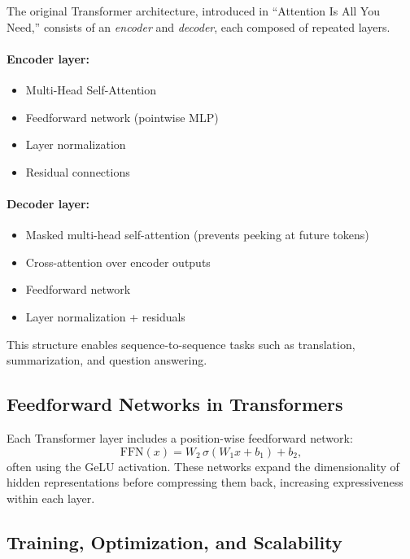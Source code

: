 \documentclass[12pt,a4paper]{report}
\begin{document}
The original Transformer architecture, introduced in “Attention Is All You Need,” consists of an \textit{encoder} and \textit{decoder}, each composed of repeated layers.

\paragraph{Encoder layer:}
\begin{itemize}
    \item Multi-Head Self-Attention
    \item Feedforward network (pointwise MLP)
    \item Layer normalization
    \item Residual connections
\end{itemize}

\paragraph{Decoder layer:}
\begin{itemize}
    \item Masked multi-head self-attention (prevents peeking at future tokens)
    \item Cross-attention over encoder outputs
    \item Feedforward network
    \item Layer normalization + residuals
\end{itemize}

This structure enables sequence-to-sequence tasks such as translation, summarization, and question answering.

\vspace{1em}
\subsection{Feedforward Networks in Transformers}

Each Transformer layer includes a position-wise feedforward network:
\[
\text{FFN}(x) = W_2 \, \sigma(W_1 x + b_1) + b_2,
\]
often using the GeLU activation.  
These networks expand the dimensionality of hidden representations before compressing them back, increasing expressiveness within each layer.

\vspace{1em}
\subsection{Training, Optimization, and Scalability}
\end{document}
